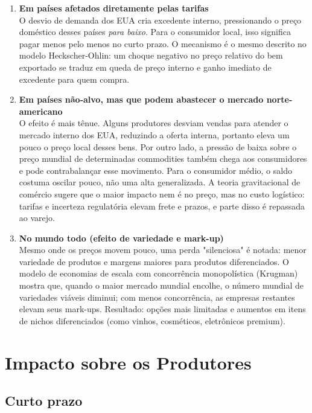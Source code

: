 \documentclass[a4paper,12pt]{article}[abntex2]
\begin{document}
\begin{enumerate}
    \item \textbf{Em países afetados diretamente pelas tarifas}\\
    O desvio de demanda dos EUA cria excedente interno, pressionando o preço doméstico desses países \emph{para baixo}.  
    Para o consumidor local, isso significa pagar menos pelo menos no curto prazo. O mecanismo é o mesmo descrito no modelo Heckscher-Ohlin: um choque negativo no preço relativo do bem exportado se traduz em queda de preço interno e ganho imediato de excedente para quem compra.

    \item \textbf{Em países não-alvo, mas que podem abastecer o mercado norte-americano}\\
    O efeito é mais tênue. Alguns produtores desviam vendas para atender o mercado interno dos EUA, reduzindo a oferta interna, portanto eleva um pouco o preço local desses bens. Por outro lado, a pressão de baixa sobre o preço mundial de determinadas commodities também chega aos consumidores e pode contrabalançar esse movimento. Para o consumidor médio, o saldo costuma oscilar pouco, não uma alta generalizada. A teoria gravitacional de comércio sugere que o maior impacto nem é no preço, mas no custo logístico: tarifas e incerteza regulatória elevam frete e prazos, e parte disso é repassada ao varejo.

    \item \textbf{No mundo todo (efeito de variedade e mark-up)}\\
    Mesmo onde os preços movem pouco, uma perda "silenciosa" é notada: menor variedade de produtos e margens maiores para produtos diferenciados. O modelo de economias de escala com concorrência monopolística (Krugman) mostra que, quando o maior mercado mundial encolhe, o número mundial de variedades viáveis diminui; com menos concorrência, as empresas restantes elevam seus mark-ups. Resultado: opções mais limitadas e aumentos em itens de nichos diferenciados (como vinhos, cosméticos, eletrônicos premium).
\end{enumerate}

\section*{\textbf{Impacto sobre os Produtores}}

\subsection*{\textbf{Curto prazo}}
\end{document}

